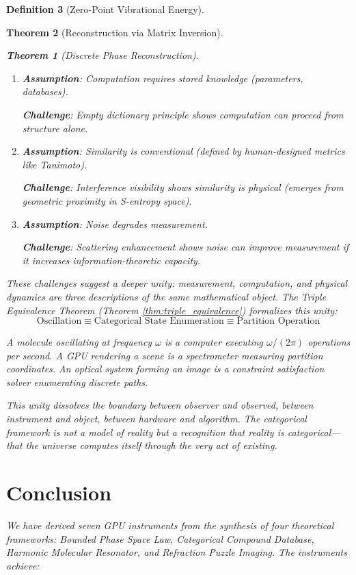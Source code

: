 \documentclass[11pt,a4paper]{article}
\newtheorem{theorem}{Theorem}[section]
\theoremstyle{definition}
\newtheorem{definition}[theorem]{Definition}
\theoremstyle{remark}
\begin{document}
\begin{definition}[Zero-Point Vibrational Energy]
\begin{theorem}[Reconstruction via Matrix Inversion]
\begin{theorem}[Discrete Phase Reconstruction]
\begin{enumerate}
\item \textbf{Assumption}: Computation requires stored knowledge (parameters, databases).

\textbf{Challenge}: Empty dictionary principle shows computation can proceed from structure alone.

\item \textbf{Assumption}: Similarity is conventional (defined by human-designed metrics like Tanimoto).

\textbf{Challenge}: Interference visibility shows similarity is physical (emerges from geometric proximity in S-entropy space).

\item \textbf{Assumption}: Noise degrades measurement.

\textbf{Challenge}: Scattering enhancement shows noise can improve measurement if it increases information-theoretic capacity.
\end{enumerate}

These challenges suggest a deeper unity: \textit{measurement, computation, and physical dynamics are three descriptions of the same mathematical object}. The Triple Equivalence Theorem (Theorem \ref{thm:triple_equivalence}) formalizes this unity:
\begin{equation}
\text{Oscillation} \equiv \text{Categorical State Enumeration} \equiv \text{Partition Operation}
\end{equation}

A molecule oscillating at frequency $\omega$ \textit{is} a computer executing $\omega/(2\pi)$ operations per second. A GPU rendering a scene \textit{is} a spectrometer measuring partition coordinates. An optical system forming an image \textit{is} a constraint satisfaction solver enumerating discrete paths.

This unity dissolves the boundary between observer and observed, between instrument and object, between hardware and algorithm. The categorical framework is not a model of reality but a recognition that reality \textit{is} categorical—that the universe computes itself through the very act of existing.

\section{Conclusion}
\label{sec:conclusion}

We have derived seven GPU instruments from the synthesis of four theoretical frameworks: Bounded Phase Space Law, Categorical Compound Database, Harmonic Molecular Resonator, and Refraction Puzzle Imaging. The instruments achieve:


\end{theorem}
\end{theorem}
\end{definition}
\end{document}
